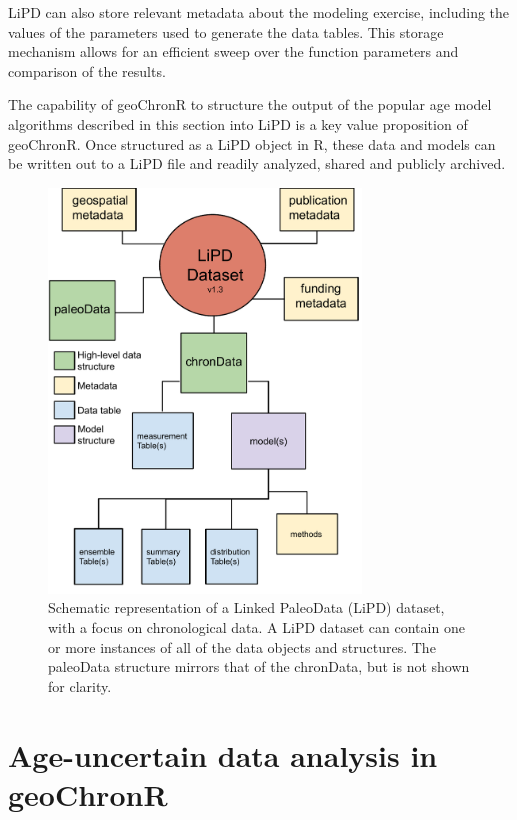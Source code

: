 \documentclass[gchron, manuscript]{copernicus}
\begin{document}
LiPD can also store relevant metadata about the modeling exercise,
including the values of the parameters used to generate the data tables.
This storage mechanism allows for an efficient sweep over the function
parameters and comparison of the results.

The capability of geoChronR to structure the output of the popular age
model algorithms described in this section into LiPD is a key value
proposition of geoChronR. Once structured as a LiPD object in R, these
data and models can be written out to a LiPD file and readily analyzed,
shared and publicly archived.

\begin{figure}
\includegraphics[width=8.3cm]{LPD schematic 1.3 - chronData} \caption{Schematic representation of a Linked PaleoData (LiPD) dataset, with a focus on chronological data. A LiPD dataset can contain one or more instances of all of the data objects and structures. The paleoData structure mirrors that of the chronData, but is not shown for clarity.}\label{fig:lipd-chron}
\end{figure}

\hypertarget{sec:age-uncertain-analysis}{%
\section{Age-uncertain data analysis in
geoChronR}\label{sec:age-uncertain-analysis}}
\end{document}
